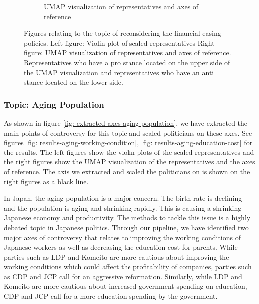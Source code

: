 \documentclass[final,5p,times,twocolumn,authoryear]{elsarticle}
\begin{document}
\begin{figure}[h]
\begin{subfigure}{0.22\textwidth}
      \caption{UMAP visualization of representatives and axes of reference}
    \end{subfigure}
\caption{Figures relating to the topic of reconsidering the financial easing policies. Left figure: Violin plot of scaled representatives Right figure: UMAP visualization of representatives and axes of reference. Representatives who have a pro stance located on the upper side of the UMAP visualization and representatives who have an anti stance located on the lower side.}
\label{fig: results-economy-financial-easing}
\end{figure}
\FloatBarrier

\subsubsection{Topic: Aging Population}
As shown in figure \ref{fig: extracted axes aging population}, we have extracted the main points of controversy for this topic and scaled politicians on these axes. See figures \ref{fig: results-aging-working-condition}, \ref{fig: results-aging-education-cost} for the results. The left figures show the violin plots of the scaled representatives and the right figures show the UMAP visualization of the representatives and the axes of reference. The axis we extracted and scaled the politicians on is shown on the right figures as a black line. 

In Japan, the aging population is a major concern. The birth rate is declining and the population is aging and shrinking rapidly. This is causing a shrinking Japanese economy and productivity. The methods to tackle this issue is a highly debated topic in Japanese politics. Through our pipeline, we have identified two major axes of controversy that relates to improving the working conditions of Japanese workers as well as decreasing the education cost for parents. While parties such as LDP and Komeito are more cautious about improving the working conditions which could affect the profitability of companies, parties such as CDP and JCP call for an aggressive reformation. Similarly, while LDP and Komeito are more cautious about increased government spending on education, CDP and JCP call for a more education spending by the government. 
\end{document}
